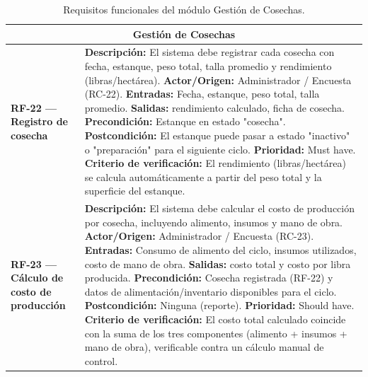 \documentclass[11pt,a4paper]{article}
\begin{document}
\begin{longtable}{|p{3.5cm}|p{12cm}|}
\caption{Requisitos funcionales del módulo Gestión de Cosechas.}
\label{tab:rf-cosechas} \\
\hline

\multicolumn{2}{|c|}{\textbf{Gestión de Cosechas}} \\ \hline

\textbf{RF-22 — Registro de cosecha} &
\textbf{Descripción:} El sistema debe registrar cada cosecha con fecha, estanque, peso total, talla promedio y rendimiento (libras/hectárea). \newline
\textbf{Actor/Origen:} Administrador / Encuesta (RC-22). \newline
\textbf{Entradas:} Fecha, estanque, peso total, talla promedio. \newline
\textbf{Salidas:} rendimiento calculado, ficha de cosecha. \newline
\textbf{Precondición:} Estanque en estado "cosecha". \newline
\textbf{Postcondición:} El estanque puede pasar a estado "inactivo" o "preparación" para el siguiente ciclo. \newline
\textbf{Prioridad:} Must have. \newline
\textbf{Criterio de verificación:} El rendimiento (libras/hectárea) se calcula automáticamente a partir del peso total y la superficie del estanque. \\ \hline

\textbf{RF-23 — Cálculo de costo de producción} &
\textbf{Descripción:} El sistema debe calcular el costo de producción por cosecha, incluyendo alimento, insumos y mano de obra. \newline
\textbf{Actor/Origen:} Administrador / Encuesta (RC-23). \newline
\textbf{Entradas:} Consumo de alimento del ciclo, insumos utilizados, costo de mano de obra. \newline
\textbf{Salidas:} costo total y costo por libra producida. \newline
\textbf{Precondición:} Cosecha registrada (RF-22) y datos de alimentación/inventario disponibles para el ciclo. \newline
\textbf{Postcondición:} Ninguna (reporte). \newline
\textbf{Prioridad:} Should have. \newline
\textbf{Criterio de verificación:} El costo total calculado coincide con la suma de los tres componentes (alimento + insumos + mano de obra), verificable contra un cálculo manual de control. \\ \hline

\end{longtable}
\end{document}

